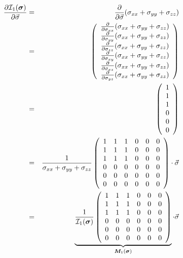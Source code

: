 \begin{eqnarray}
\frac{\partial {\cal I}_1(\bm\sigma)}{\partial \vec\sigma} 
&=& \frac{\partial }{\partial \vec\sigma} (\sigma_{xx}+\sigma_{yy}+\sigma_{zz})\nonumber\\
&=& \left(
\begin{array}{c}
\frac{\partial }{\partial \sigma_{xx}} (\sigma_{xx}+\sigma_{yy}+\sigma_{zz}) \\
\frac{\partial }{\partial \sigma_{yy}} (\sigma_{xx}+\sigma_{yy}+\sigma_{zz}) \\
\frac{\partial }{\partial \sigma_{zz}} (\sigma_{xx}+\sigma_{yy}+\sigma_{zz}) \\
\frac{\partial }{\partial \sigma_{xy}} (\sigma_{xx}+\sigma_{yy}+\sigma_{zz}) \\
\frac{\partial }{\partial \sigma_{xz}} (\sigma_{xx}+\sigma_{yy}+\sigma_{zz}) \\
\frac{\partial }{\partial \sigma_{yz}} (\sigma_{xx}+\sigma_{yy}+\sigma_{zz}) 
\end{array}
\right) \nonumber\\
&=& \left(
\begin{array}{c}
1 \\ 1 \\ 1 \\ 0 \\ 0 \\ 0 
\end{array}
\right) \nonumber\\
&=&
\frac{1}{\sigma_{xx}+\sigma_{yy}+\sigma_{zz}}
\left(
\begin{array}{cccccc}
1 & 1 & 1 & 0 & 0 & 0 \\
1 & 1 & 1 & 0 & 0 & 0 \\
1 & 1 & 1 & 0 & 0 & 0 \\
0 & 0 & 0 & 0 & 0 & 0 \\
0 & 0 & 0 & 0 & 0 & 0 \\
0 & 0 & 0 & 0 & 0 & 0 
\end{array}
\right) \cdot \vec\sigma \nonumber\\
&=&
\underbrace{
\frac{1}{{\cal I}_1(\bm\sigma)}
\left(
\begin{array}{cccccc}
1 & 1 & 1 & 0 & 0 & 0 \\
1 & 1 & 1 & 0 & 0 & 0 \\
1 & 1 & 1 & 0 & 0 & 0 \\
0 & 0 & 0 & 0 & 0 & 0 \\
0 & 0 & 0 & 0 & 0 & 0 \\
0 & 0 & 0 & 0 & 0 & 0 
\end{array}
\right)}_{{\bm M}_1(\bm\sigma)}
\cdot \vec\sigma
\end{eqnarray}


